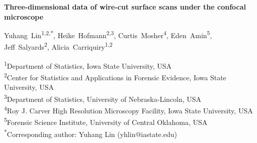 \documentclass[11pt,a4paper]{article}
\begin{document}
\linenumbers

\begin{center}
{\LARGE\bfseries Three-dimensional data of wire-cut surface scans under
the confocal microscope\par}
\vspace{1em}
{\large
\mbox{Yuhang Lin\textsuperscript{1,2,*}}, %
\mbox{Heike Hofmann\textsuperscript{2,3}}, %
\mbox{Curtis Mosher\textsuperscript{4}}, %
\mbox{Eden Amin\textsuperscript{5}}, %
\mbox{Jeff Salyards\textsuperscript{2}}, %
\mbox{Alicia Carriquiry\textsuperscript{1,2}}\par}
\vspace{0.75em}
{\small
\textsuperscript{1}Department of Statistics, Iowa State
University, USA\\
\textsuperscript{2}Center for Statistics and Applications in Forensic
Evidence, Iowa State University, USA\\
\textsuperscript{3}Department of Statistics, University of
Nebraska-Lincoln, USA\\
\textsuperscript{4}Roy J. Carver High Resolution Microscopy
Facility, Iowa State University, USA\\
\textsuperscript{5}Forensic Science Institute, University of Central
Oklahoma, USA\\\textsuperscript{*}Corresponding author: Yuhang
Lin (yhlin@iastate.edu)
\par}
\end{center}
\vspace{1em}

\begin{abstract}
Wire-cut striation marks provide evidence for forensic source
identification, but publicly available datasets and reproducible
quantitative workflows for analyzing these marks are limited. We present
a dataset of 134 three-dimensional topographic scans in \texttt{x3p}
format from aluminum wires cut with five KWS-105 wire cutters. The main
experiment contains 120 scans: two replicates at each of three cutting
locations for each of the 20 tool-edge combinations. Fourteen additional
scans assess staging and acquisition variability for a randomly selected
tool and location. We provide additional scan metadata, manually
extracted profiles, processed signals, cross-correlation function (CCF)
values for pairwise aligned signals, images, and analysis code. The
accompanying workflow covers scan inspection, profile and signal
extraction, alignment, pairwise similarity visualization, CCF
distributions for same-source and different-source comparisons, and
variability assessment across replicates, stagings, and acquisitions.
The dataset and workflow support the development, evaluation, and
reproducible comparison of quantitative methods for wire-cut evidence.
\end{abstract}
\end{document}
